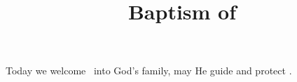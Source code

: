 \documentclass[12pt]{article}
\title{Baptism of}
\author{\peopleforenames}
\begin{document}
\maketitle \thispagestyle{empty} 

Today we welcome \peoplename\ into God's family, may He guide and protect \peopleobjpronoun. 
\end{document}
